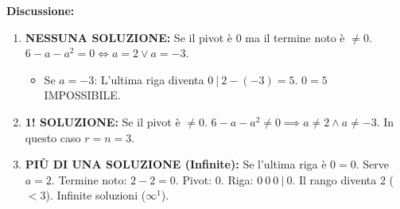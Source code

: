 \textbf{Discussione:}
\begin{enumerate}
    \item[(i)] \textbf{NESSUNA SOLUZIONE:}
    Se il pivot è $0$ ma il termine noto è $\neq 0$.
    $6-a-a^2 = 0 \iff a=2 \lor a=-3$.
    \begin{itemize}
        \item Se $a=-3$: L'ultima riga diventa $0 \ | \ 2-(-3) = 5$. $0=5$ IMPOSSIBILE.
    \end{itemize}
    
    \item[(ii)] \textbf{1! SOLUZIONE:}
    Se il pivot è $\neq 0$.
    $6-a-a^2 \neq 0 \implies a \neq 2 \land a \neq -3$.
    In questo caso $r=n=3$.
    
    \item[(iii)] \textbf{PIÙ DI UNA SOLUZIONE (Infinite):}
    Se l'ultima riga è $0=0$.
    Serve $a=2$.
    Termine noto: $2-2=0$.
    Pivot: $0$.
    Riga: $0 \ 0 \ 0 \ | \ 0$.
    Il rango diventa 2 ($<3$). Infinite soluzioni ($\infty^1$).
\end{enumerate}

\restoregeometry
